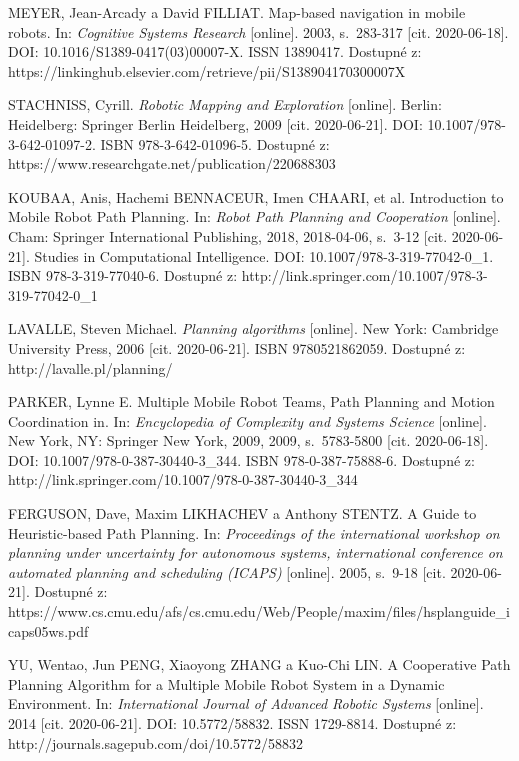 {}
\begin{thebibliography}{99}

MEYER, Jean-Arcady a David FILLIAT. Map-based navigation in mobile robots. In: \textit{Cognitive Systems Research} [online]. 2003, s.~283-317 [cit. 2020-06-18]. DOI: 10.1016/S1389-0417(03)00007-X. ISSN 13890417. Dostupné z: https://linkinghub.elsevier.com/retrieve/pii/S138904170300007X

STACHNISS, Cyrill. \textit{Robotic Mapping and Exploration} [online]. Berlin: Heidelberg: Springer Berlin Heidelberg, 2009 [cit. 2020-06-21]. DOI: 10.1007/978-3-642-01097-2. ISBN 978-3-642-01096-5. Dostupné z: https://www.researchgate.net/publication/220688303

KOUBAA, Anis, Hachemi BENNACEUR, Imen CHAARI, et al. Introduction to Mobile Robot Path Planning. In: \textit{Robot Path Planning and Cooperation} [online]. Cham: Springer International Publishing, 2018, 2018-04-06, s.~3-12 [cit. 2020-06-21]. Studies in Computational Intelligence. DOI: 10.1007/978-3-319-77042-0\_1. ISBN 978-3-319-77040-6. Dostupné z: http://link.springer.com/10.1007/978-3-319-77042-0\_1

LAVALLE, Steven Michael. \textit{Planning algorithms} [online]. New York: Cambridge University Press, 2006 [cit. 2020-06-21]. ISBN 9780521862059. Dostupné z: http://lavalle.pl/planning/

PARKER, Lynne E. Multiple Mobile Robot Teams, Path Planning and Motion Coordination in. In: \textit{Encyclopedia of Complexity and Systems Science} [online]. New York, NY: Springer New York, 2009, 2009, s.~5783-5800 [cit. 2020-06-18]. DOI: 10.1007/978-0-387-30440-3\_344. ISBN 978-0-387-75888-6. Dostupné z: http://link.springer.com/10.1007/978-0-387-30440-3\_344

FERGUSON, Dave, Maxim LIKHACHEV a Anthony STENTZ. A Guide to Heuristic-based Path Planning. In: \textit{Proceedings of the international workshop on planning under uncertainty for autonomous systems, international conference on automated planning and scheduling (ICAPS)} [online]. 2005, s.~9-18 [cit. 2020-06-21]. Dostupné z: https://www.cs.cmu.edu/afs/cs.cmu.edu/Web/People/maxim/files/hsplanguide\_icaps05ws.pdf

YU, Wentao, Jun PENG, Xiaoyong ZHANG a Kuo-Chi LIN. A Cooperative Path Planning Algorithm for a Multiple Mobile Robot System in a Dynamic Environment. In: \textit{International Journal of Advanced Robotic Systems} [online]. 2014 [cit. 2020-06-21]. DOI: 10.5772/58832. ISSN 1729-8814. Dostupné z: http://journals.sagepub.com/doi/10.5772/58832


\end{thebibliography}
